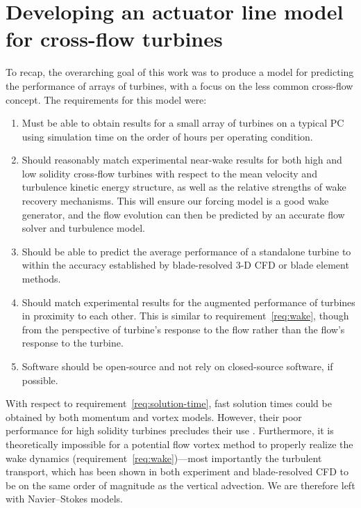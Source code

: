 \chapter{Developing an actuator line model for cross-flow turbines}

To recap, the overarching goal of this work was to produce a model for
predicting the performance of arrays of turbines, with a focus on the less
common cross-flow concept. The requirements for this model were:

\begin{enumerate}
    \item Must be able to obtain results for a small array of turbines on a
    typical PC using simulation time on the order of hours per operating
    condition.\label{req:solution-time}
    
    \item Should reasonably match experimental near-wake results for both high
    and low solidity cross-flow turbines with respect to the mean velocity and
    turbulence kinetic energy structure, as well as the relative strengths of
    wake recovery mechanisms. This will ensure our forcing model is a good wake
    generator, and the flow evolution can then be predicted by an accurate flow
    solver and turbulence model.\label{req:wake}
    
    \item Should be able to predict the average performance of a standalone
    turbine to within the accuracy established by blade-resolved 3-D CFD or
    blade element methods.
    
    \item Should match experimental results for the augmented performance of
    turbines in proximity to each other. This is similar to
    requirement~\ref{req:wake}, though from the perspective of turbine's
    response to the flow rather than the flow's response to the turbine.
    
    \item Software should be open-source and not rely on closed-source software,
    if possible.
\end{enumerate}

With respect to requirement~\ref{req:solution-time}, fast solution times could
be obtained by both momentum and vortex models. However, their poor performance
for high solidity turbines precludes their use \cite{Joo2015}. Furthermore, it
is theoretically impossible for a potential flow vortex method to properly
realize the wake dynamics (requirement~\ref{req:wake})---most importantly the
turbulent transport, which has been shown in both experiment and blade-resolved
CFD to be on the same order of magnitude as the vertical advection. We are
therefore left with Navier--Stokes models.

